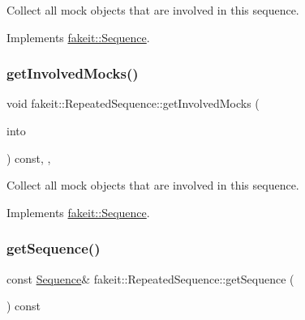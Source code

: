 Collect all mock objects that are involved in this sequence. 



Implements \mbox{\hyperlink{classfakeit_1_1Sequence_a4af96a0de0fa659fe826431e4d61757a}{fakeit\+::\+Sequence}}.

\mbox{\label{classfakeit_1_1RepeatedSequence_a4271add0945bdf443562df683e77777d}} 
\subsubsection{\texorpdfstring{getInvolvedMocks()}{getInvolvedMocks()}\hspace{0.1cm}{\footnotesize\ttfamily [9/9]}}
{\footnotesize\ttfamily void fakeit\+::\+Repeated\+Sequence\+::get\+Involved\+Mocks (\begin{DoxyParamCaption}\item[{std\+::vector$<$ \mbox{\hyperlink{structfakeit_1_1ActualInvocationsSource}{Actual\+Invocations\+Source}} $\ast$ $>$ \&}]{into }\end{DoxyParamCaption}) const\hspace{0.3cm}{\ttfamily [inline]}, {\ttfamily [override]}, {\ttfamily [virtual]}}



Collect all mock objects that are involved in this sequence. 



Implements \mbox{\hyperlink{classfakeit_1_1Sequence_a4af96a0de0fa659fe826431e4d61757a}{fakeit\+::\+Sequence}}.

\mbox{\label{classfakeit_1_1RepeatedSequence_ad85825e1b9a47002d468c85f822d7f5e}} 
\subsubsection{\texorpdfstring{getSequence()}{getSequence()}\hspace{0.1cm}{\footnotesize\ttfamily [1/9]}}
{\footnotesize\ttfamily const \mbox{\hyperlink{classfakeit_1_1Sequence}{Sequence}}\& fakeit\+::\+Repeated\+Sequence\+::get\+Sequence (\begin{DoxyParamCaption}{ }\end{DoxyParamCaption}) const\hspace{0.3cm}{\ttfamily [inline]}}

